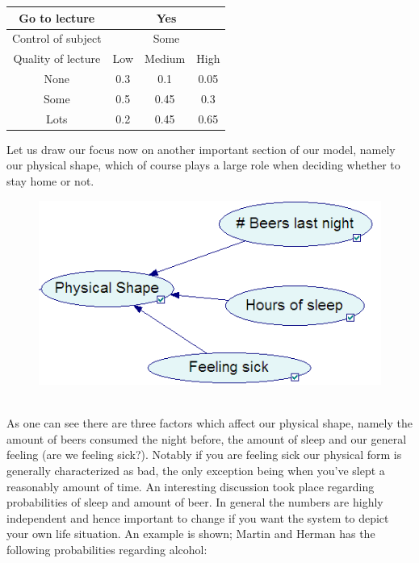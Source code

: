 \documentclass{article}
\begin{document}
\begin{table}[h]
  \centering
  \begin{tabular}{|c||c|c|c|} \hline
    Go to lecture & \multicolumn{3}{|c|}{Yes} \\ \hline
    Control of subject & \multicolumn{3}{|c|}{Some} \\ \hline
    Quality of lecture & Low & Medium & High \\ \hline \hline
    None & 0.3 & 0.1 & 0.05 \\ \hline
    Some & 0.5 & 0.45 & 0.3 \\ \hline
    Lots & 0.2 & 0.45 & 0.65 \\ \hline
  \end{tabular}
\end{table}

Let us draw our focus now on another important section of our model, namely our physical shape,
which of course plays a large role when deciding whether to stay home or not. 
\\
\begin{figure}[h]
  \centering
  \includegraphics[scale=0.45]{physical_shape.png}
\end{figure}
\\
As one can see there are three factors which affect our physical shape, namely
the amount of beers consumed the night before, the amount of sleep and our
general feeling (are we feeling sick?). Notably if you are feeling sick our
physical form is generally characterized as bad, the only exception being when
you’ve slept a reasonably amount of time.  An interesting discussion took place
regarding probabilities of sleep and amount of beer. In general the numbers are
highly independent and hence important to change if you want the system to
depict your own life situation. An example is shown; Martin and Herman has the
following probabilities regarding alcohol:
\end{document}
